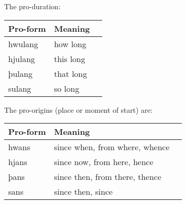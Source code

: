 The pro-duration:

\begin{center}
\begin{tabular}{lll}
Pro-form & Meaning \\
\hline
hwulang & how long  \\
hjulang & this long \\
þulang  & that long \\
sulang  & so long   \\
\end{tabular}
\end{center}

The pro-origins (place or moment of start) are:

\begin{center}
\begin{tabular}{lll}
Pro-form & Meaning \\
\hline
hwans & since when, from where, whence \\
hjans & since now, from here, hence \\
þans  & since then, from there, thence \\
sans  & since then, since \\
\end{tabular}
\end{center}